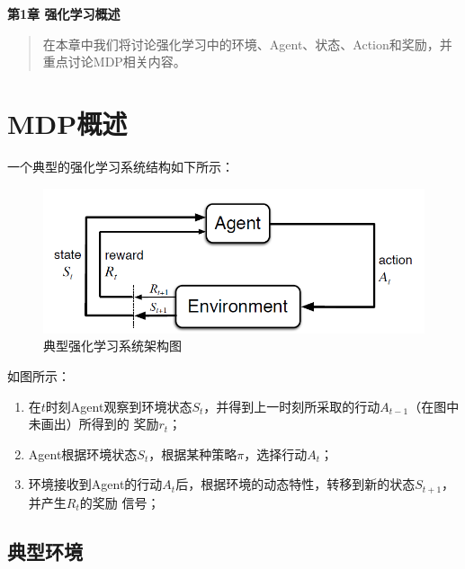 \newpage
\maketitle
\begin{center}
\Large \textbf{第1章 强化学习概述} \quad 
\end{center}
\begin{abstract}
在本章中我们将讨论强化学习中的环境、Agent、状态、Action和奖励，并重点讨论MDP相关内容。
\end{abstract}
\section{MDP概述}
一个典型的强化学习系统结构如下所示：
\begin{figure}[H]
	\caption{典型强化学习系统架构图}
	\label{p000001}
	\centering
	\includegraphics[width=15cm]{images/p000001}
\end{figure}
如图所示：
\begin{enumerate}
    \item 在$t$时刻Agent观察到环境状态$S_{t}$，并得到上一时刻所采取的行动$A_{t-1}$（在图中未画出）所得到的
奖励$r_{t}$；
    \item Agent根据环境状态$S_{t}$，根据某种策略$\pi$，选择行动$A_{t}$；
    \item 环境接收到Agent的行动$A_{t}$后，根据环境的动态特性，转移到新的状态$S_{t+1}$，并产生$R_{t}$的奖励
信号；
\end{enumerate}
\subsection{典型环境}

